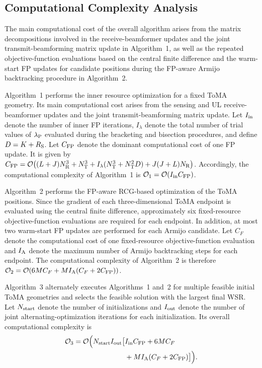 \documentclass[letterpaper,journal]{IEEEtran}
\begin{document}
\subsection{Computational Complexity Analysis}
\label{subsec:complexity}

The main computational cost of the overall algorithm arises from the
matrix decompositions involved in the receive-beamformer updates and the
joint transmit-beamforming matrix update in Algorithm~1, as well as the
repeated objective-function evaluations based on the central finite
difference and the warm-start FP updates for candidate positions during
the FP-aware Armijo backtracking procedure in Algorithm~2.

Algorithm~1 performs the inner resource optimization for a fixed
ToMA geometry. Its main computational cost arises from the sensing
and UL receive-beamformer updates and the joint transmit-beamforming
matrix update. Let $I_{\rm in}$ denote the number of inner FP
iterations, $I_{\lambda}$ denote the total number of trial values of
$\lambda_{\rm P}$ evaluated during the bracketing and bisection
procedures, and define $D=K+R_{\rm S}$. Let $C_{\rm FP}$ denote the dominant computational cost of one
FP update. It is given by
$C_{\rm FP}=\mathcal{O}\!\left(
(L+J)N_{\rm R}^{3}
+N_{\rm T}^{3}
+I_{\lambda}(N_{\rm T}^{3}+N_{\rm T}^{2}D)
+J(J+L)N_{\rm R}
\right)$.
Accordingly, the computational complexity of Algorithm~1 is
$\mathcal{O}_1=\mathcal{O}(I_{\rm in}C_{\rm FP})$.

Algorithm~2 performs the FP-aware RCG-based optimization of the ToMA positions.
Since the gradient of each three-dimensional ToMA endpoint is evaluated
using the central finite difference, approximately six fixed-resource
objective-function evaluations are required for each endpoint. In
addition, at most two warm-start FP updates are performed for each
Armijo candidate. Let $C_F$ denote the computational cost of one
fixed-resource objective-function evaluation and $I_{\rm A}$ denote the
maximum number of Armijo backtracking steps for each endpoint. The computational complexity of Algorithm~2 is therefore
$\mathcal{O}_2=\mathcal{O}\!\left(
6MC_F+MI_{\rm A}(C_F+2C_{\rm FP})
\right)$.

Algorithm~3 alternately executes Algorithms~1 and~2 for multiple
feasible initial ToMA geometries and selects the feasible solution with
the largest final WSR. Let $N_{\rm start}$ denote the number of
initializations and $I_{\rm out}$ denote the number of joint
alternating-optimization iterations for each initialization. Its overall
computational complexity is
\begin{equation}
\begin{aligned}
\mathcal{O}_3
=
\mathcal{O}\Big(
N_{\rm start}I_{\rm out}
\big[
&I_{\rm in}C_{\rm FP}
+6MC_F \\
&+MI_{\rm A}(C_F+2C_{\rm FP})
\big]
\Big).
\end{aligned}
\label{eq:complexity_alg3}
\end{equation}
\end{document}
